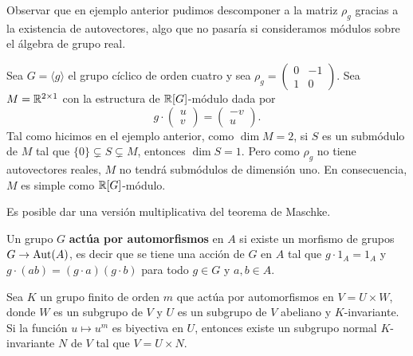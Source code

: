 Observar que en ejemplo anterior pudimos descomponer a la matriz $\rho_g$ 
gracias a la existencia de autovectores, algo 
que no pasaría si consideramos módulos sobre el álgebra de grupo real.   

\begin{example}
Sea $G=\langle g\rangle$ el grupo cíclico de orden cuatro y sea $\rho_g=\begin{pmatrix}
0&-1\\
1&0\end{pmatrix}$. 
Sea $M=\mathbb{R}^{2\times 1}$ con la estructura de $\mathbb{R}[G]$-módulo dada por 
\[
g\cdot\begin{pmatrix}u\\v\end{pmatrix}
=\begin{pmatrix}-v\\u\end{pmatrix}.
\]
Tal como hicimos en el ejemplo anterior, 
como $\dim M=2$, si $S$ es un submódulo de $M$ tal que $\{0\}\subsetneq S\subsetneq M$, entonces $\dim S=1$. 
Pero como $\rho_g$ no tiene autovectores reales, $M$ no tendrá submódulos de dimensión uno.  
En consecuencia, $M$ es simple como $\mathbb{R}[G]$-módulo. 
\end{example}

Es posible dar una versión multiplicativa del teorema de Maschke. 

Un grupo $G$ \textbf{actúa por automorfismos} en $A$ si existe
un morfismo de grupos $G\to\operatorname{Aut}(A)$, es decir que se tiene una acción de $G$ en $A$ 
tal que $g\cdot 1_A=1_A$ y $g\cdot (ab)=(g\cdot a)(g\cdot b)$ para todo $g\in G$ y $a,b\in A$. 

\begin{theorem}
Sea $K$ un grupo finito de orden $m$ que actúa por automorfismos en $V=U\times W$, donde $W$ es un subgrupo de $V$ y 
$U$ es un subgrupo de $V$ abeliano y $K$-invariante. Si la función $u\mapsto u^m$ es biyectiva en $U$, 
entonces existe un subgrupo normal $K$-invariante $N$ de $V$ tal que $V=U\times N$.
\end{theorem}

